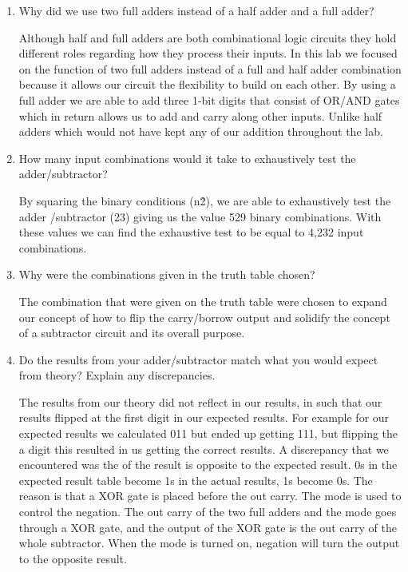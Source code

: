 \documentclass[11pt]{article}
\begin{document}
\begin{enumerate}
	\item  Why did we use two full adders instead of a half adder and a full adder?
	
	Although half and full adders are both combinational logic circuits they hold different roles regarding how they process their inputs. In this lab we focused on the function of two full adders instead of a full and half adder combination because it allows our circuit the flexibility to build on each other. By using a full adder we are able to add three 1-bit digits that consist of OR/AND gates which in return allows us to add and carry along other inputs. Unlike half adders which would not have kept any of our addition throughout the lab. 
	
	\item How many input combinations would it take to exhaustively test the adder/subtractor?
	
	By squaring the binary conditions (n\^2),  we are able to exhaustively test the adder /subtractor (23) giving us the value 529 binary combinations. With these values we can find the exhaustive test to be equal to 4,232 input combinations. 
	
	\item Why were the combinations given in the truth table chosen?
	
	The combination that were given on the truth table were chosen to expand our concept of how to flip the carry/borrow output and solidify the concept of a subtractor circuit and its overall purpose.
	
	\item Do the results from your adder/subtractor match what you would expect from theory? Explain any discrepancies.
	
	The results from our theory did not reflect in our results, in such that our results flipped at the first digit in our expected results. For example for our expected results we calculated 011 but ended up getting 111, but flipping the a digit this resulted in us getting the correct results. A discrepancy that we encountered was the of the result is opposite to the expected result. 0s in the expected result table become 1s in the actual results, 1s become 0s. The reason is that a XOR gate is placed before the out carry. The mode is used to control the negation. The out carry of the two full adders and the mode goes through a XOR gate, and the output of the XOR gate is the out carry of the whole subtractor. When the mode is turned on, negation will turn the output to the opposite result. 
	
\end{enumerate}
\end{document}
